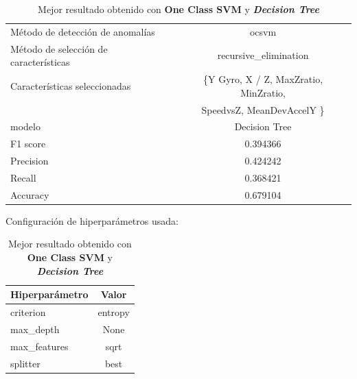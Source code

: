 \begin{appendices}
		\begin{table}[htb]
			\centering
			\caption{Mejor resultado obtenido con \textbf{One Class SVM} y \textbf{\emph{Decision Tree}}}
			\label{table:24}
			\begin{tabular}{lc}
				\toprule
				\midrule
					  Método de detección de anomalías &                                              ocsvm \\
				Método de selección de características &                              recursive\_elimination \\
						 Características seleccionadas & \{Y Gyro, X / Z, MaxZratio, MinZratio, \\
						 							   &   SpeedvsZ,  MeanDevAccelY \}\\
												modelo &                                      Decision Tree \\
											  F1 score &                                           0.394366 \\
											 Precision &                                           0.424242 \\
												Recall &                                           0.368421 \\
											  Accuracy &                                           0.679104 \\
				\bottomrule
			\end{tabular}
			\newline
			\newline
			Configuración de hiperparámetros usada:
			\begin{tabular}{lc}
				\toprule
				Hiperparámetro &   Valor \\
				\midrule
					 criterion & entropy \\
					 max\_depth &    None \\
				  max\_features &    sqrt \\
					  splitter &    best \\
				\bottomrule
			\end{tabular}
			
		\end{table}


\end{appendices}
